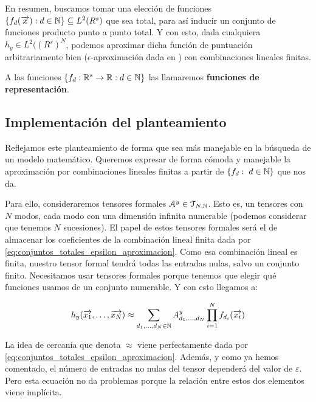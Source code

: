 En resumen, buscamos tomar una elección de funciones $\{f_d(\overrightarrow{x}): d \in \mathbb{N}\} \subseteq L^2(R^s)$ que sea total, para así inducir un conjunto de funciones producto punto a punto total. Y con esto, dada cualquiera $h_y \in L^2((R^s)^N$, podemos aproximar dicha función de puntuación arbitrariamente bien ($\epsilon$-aproximación dada en ) con combinaciones lineales finitas.

A las funciones $\{ f_d: \mathbb{R}^s \to \mathbb{R}: d \in \mathbb{N} \}$ las llamaremos \textbf{funciones de representación}.

\subsection{Implementación del planteamiento}

Reflejamos este planteamiento de forma que sea más manejable en la búsqueda de un modelo matemático. Queremos expresar de forma cómoda y manejable la aproximación por combinaciones lineales finitas a partir de $\{ f_d: \; d \in \mathbb{N} \}$ que  nos da.

Para ello, consideraremos tensores formales $\mathcal{A}^y \in \mathcal{T}_{N, \mathbb{N}}$. Esto es, un tensores con $N$ modos, cada modo con una dimensión infinita numerable (podemos considerar que tenemos $N$ sucesiones). El papel de estos tensores formales será el de almacenar los coeficientes de la combinación lineal finita dada por \eqref{eq:conjuntos_totales_epsilon_aproximacion}. Como esa combinación lineal es finita, nuestro tensor formal tendrá todas las entradas nulas, salvo un conjunto finito. Necesitamos usar tensores formales porque tenemos que elegir qué funciones usamos de un conjunto numerable. Y con esto llegamos a:

\begin{equation} \label{eq:hipotesis_en_general}
    h_y(\overrightarrow{x_1}, \ldots, \overrightarrow{x_N}) \approx \sum_{d_1, \ldots, d_N \in \mathbb{N}} A^y_{d_1, \ldots, d_N} \prod_{i = 1}^N f_{d_i}(\overrightarrow{x_i})
\end{equation}

\begin{observacion}

    La idea de cercanía que denota $\approx$ viene perfectamente dada por \eqref{eq:conjuntos_totales_epsilon_aproximacion}. Además, y como ya hemos comentado, el número de entradas no nulas del tensor dependerá del valor de $\varepsilon$. Pero esta ecuación no da problemas porque la relación entre estos dos elementos viene implícita.

\end{observacion}

